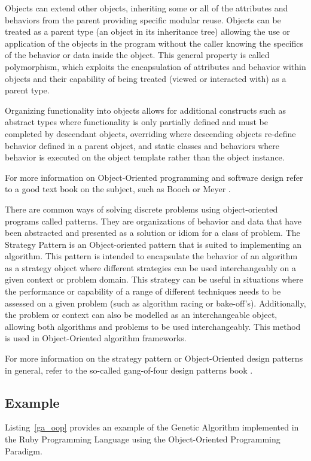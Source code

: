 \documentclass[a4paper, 11pt]{article}
\begin{document}
Objects can extend other objects, inheriting some or all of the attributes and behaviors from the parent providing specific modular reuse. Objects can be treated as a parent type (an object in its inheritance tree) allowing the use or application of the objects in the program without the caller knowing the specifics of the behavior or data inside the object. This general property is called polymorphism, which exploits the encapsulation of attributes and behavior within objects and their capability of being treated (viewed or interacted with) as a parent type.

Organizing functionality into objects allows for additional constructs such as abstract types where functionality is only partially defined and must be completed by descendant objects, overriding where descending objects re-define behavior defined in a parent object, and static classes and behaviors where behavior is executed on the object template rather than the object instance. 

For more information on Object-Oriented programming and software design refer to a good text book on the subject, such as Booch \cite{Booch1997} or Meyer \cite{Meyer1997}.

There are common ways of solving discrete problems using object-oriented programs called patterns. They are organizations of behavior and data that have been abstracted and presented as a solution or idiom for a class of problem. The Strategy Pattern is an Object-oriented pattern that is suited to implementing an algorithm. This pattern is intended to encapsulate the behavior of an algorithm as a strategy object where different strategies can be used interchangeably on a given context or problem domain. This strategy can be useful in situations where the performance or capability of a range of different techniques needs to be assessed on a given problem (such as algorithm racing or bake-off's). Additionally, the problem or context can also be modelled as an interchangeable object, allowing both algorithms and problems to be used interchangeably. This method is used in Object-Oriented algorithm frameworks.

For more information on the strategy pattern or Object-Oriented design patterns in general, refer to the so-called gang-of-four design patterns book \cite{Gamma1995}.

\subsection{Example}
Listing~\ref{ga_oop} provides an example of the Genetic Algorithm implemented in the Ruby Programming Language using the Object-Oriented Programming Paradigm. 
\end{document}
